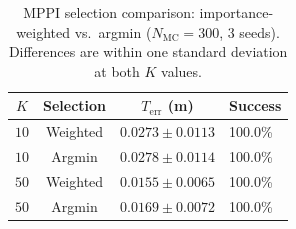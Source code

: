 \begin{table}[t]
\centering
\caption{MPPI selection comparison: importance-weighted vs.\ argmin ($N_{\mathrm{MC}}=300$, 3 seeds). Differences are within one standard deviation at both $K$ values.}
\label{tab:mppi_selection}
\begin{tabular}{cccl}
\toprule
$K$ & Selection & $T_{\mathrm{err}}$ (m) & Success \\
\midrule
  $10$ & Weighted & $0.0273 \pm 0.0113$ & 100.0\% \\
  $10$ & Argmin & $0.0278 \pm 0.0114$ & 100.0\% \\
  $50$ & Weighted & $0.0155 \pm 0.0065$ & 100.0\% \\
  $50$ & Argmin & $0.0169 \pm 0.0072$ & 100.0\% \\
\bottomrule
\end{tabular}
\end{table}
